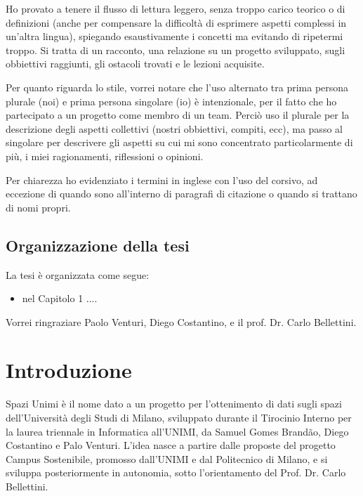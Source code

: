 \documentclass[12pt]{report}
\begin{document}
Ho provato a tenere il flusso di lettura leggero, senza troppo carico
teorico o di definizioni (anche per compensare la difficoltà di esprimere
aspetti complessi in un'altra lingua), spiegando esaustivamente i 
concetti ma evitando di ripetermi troppo. Si tratta di un racconto, 
una relazione su un progetto sviluppato, sugli obbiettivi raggiunti, 
gli ostacoli trovati e le lezioni acquisite.

Per quanto riguarda lo stile, vorrei notare che l'uso alternato tra prima
persona plurale (noi) e prima persona singolare (io) è intenzionale, per
il fatto che ho partecipato a un progetto come membro di un team. Perciò
uso il plurale per la descrizione degli aspetti collettivi 
(nostri obbiettivi, compiti, ecc), ma passo al singolare per descrivere gli
aspetti su cui mi sono concentrato particolarmente di più, i miei
ragionamenti, riflessioni o opinioni.

Per chiarezza ho evidenziato i termini in inglese con l'uso del corsivo, 
ad eccezione di quando sono all'interno di paragrafi di citazione o quando
si trattano di nomi propri.

%
%
\section*{Organizzazione della tesi}
\label{organizzazione}
La tesi \`e organizzata come segue:
\begin{itemize}
\item nel Capitolo 1 ....
\end{itemize}
%
%
Vorrei ringraziare Paolo Venturi, Diego Costantino, 
e il prof. Dr. Carlo Bellettini. 
\afterpreface


% 
% 
\chapter{Introduzione}
\label{cap1}

Spazi Unimi è il nome dato a un progetto per l'ottenimento di dati sugli spazi dell’Università degli Studi di Milano, sviluppato durante il Tirocinio Interno per la laurea triennale in Informatica all’UNIMI, da Samuel Gomes Brandão, Diego Costantino e Palo Venturi. L'idea nasce a partire dalle proposte del progetto Campus Sostenibile, promosso dall’UNIMI e dal Politecnico di Milano, e si sviluppa posteriormente in autonomia, sotto l'orientamento del Prof. Dr. Carlo Bellettini.
\end{document}
